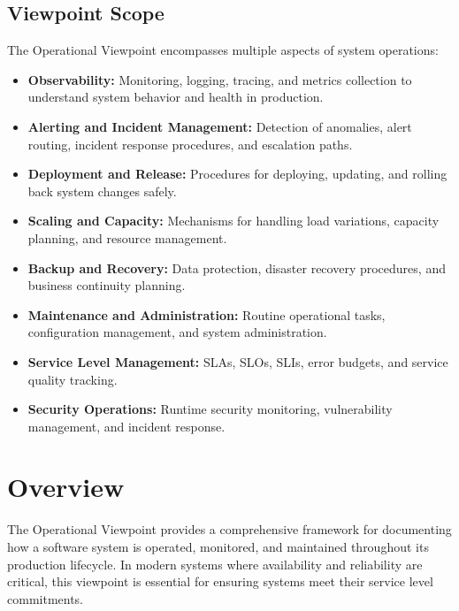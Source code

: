 \documentclass[11pt,letterpaper]{article}
\begin{document}
\subsection{Viewpoint Scope}

The Operational Viewpoint encompasses multiple aspects of system operations:

\begin{itemize}
    \item \textbf{Observability:} Monitoring, logging, tracing, and metrics collection to understand system behavior and health in production.
    
    \item \textbf{Alerting and Incident Management:} Detection of anomalies, alert routing, incident response procedures, and escalation paths.
    
    \item \textbf{Deployment and Release:} Procedures for deploying, updating, and rolling back system changes safely.
    
    \item \textbf{Scaling and Capacity:} Mechanisms for handling load variations, capacity planning, and resource management.
    
    \item \textbf{Backup and Recovery:} Data protection, disaster recovery procedures, and business continuity planning.
    
    \item \textbf{Maintenance and Administration:} Routine operational tasks, configuration management, and system administration.
    
    \item \textbf{Service Level Management:} SLAs, SLOs, SLIs, error budgets, and service quality tracking.
    
    \item \textbf{Security Operations:} Runtime security monitoring, vulnerability management, and incident response.
\end{itemize}

\section{Overview}

The Operational Viewpoint provides a comprehensive framework for documenting how a software system is operated, monitored, and maintained throughout its production lifecycle. In modern systems where availability and reliability are critical, this viewpoint is essential for ensuring systems meet their service level commitments.
\end{document}
